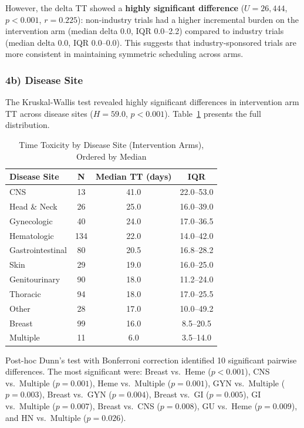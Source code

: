 \documentclass[11pt,a4paper]{article}
\begin{document}
However, the delta TT showed a \textbf{highly significant difference} ($U=26{,}444$, $p<0.001$, $r=0.225$): non-industry trials had a higher incremental burden on the intervention arm (median delta 0.0, IQR 0.0--2.2) compared to industry trials (median delta 0.0, IQR 0.0--0.0). This suggests that industry-sponsored trials are more consistent in maintaining symmetric scheduling across arms.

\subsubsection{4b) Disease Site}

The Kruskal-Wallis test revealed highly significant differences in intervention arm TT across disease sites ($H=59.0$, $p<0.001$). Table~\ref{tab:disease} presents the full distribution.

\begin{table}[H]
\centering
\caption{Time Toxicity by Disease Site (Intervention Arms), Ordered by Median}
\label{tab:disease}
\begin{tabular}{lccc}
\toprule
\textbf{Disease Site} & \textbf{N} & \textbf{Median TT (days)} & \textbf{IQR} \\
\midrule
CNS & 13 & 41.0 & 22.0--53.0 \\
Head \& Neck & 26 & 25.0 & 16.0--39.0 \\
Gynecologic & 40 & 24.0 & 17.0--36.5 \\
Hematologic & 134 & 22.0 & 14.0--42.0 \\
Gastrointestinal & 80 & 20.5 & 16.8--28.2 \\
Skin & 29 & 19.0 & 16.0--25.0 \\
Genitourinary & 90 & 18.0 & 11.2--24.0 \\
Thoracic & 94 & 18.0 & 17.0--25.5 \\
Other & 28 & 17.0 & 10.0--49.2 \\
Breast & 99 & 16.0 & 8.5--20.5 \\
Multiple & 11 & 6.0 & 3.5--14.0 \\
\bottomrule
\end{tabular}
\end{table}

Post-hoc Dunn's test with Bonferroni correction identified 10 significant pairwise differences. The most significant were: Breast vs.\ Heme ($p<0.001$), CNS vs.\ Multiple ($p=0.001$), Heme vs.\ Multiple ($p=0.001$), GYN vs.\ Multiple ($p=0.003$), Breast vs.\ GYN ($p=0.004$), Breast vs.\ GI ($p=0.005$), GI vs.\ Multiple ($p=0.007$), Breast vs.\ CNS ($p=0.008$), GU vs.\ Heme ($p=0.009$), and HN vs.\ Multiple ($p=0.026$).
\end{document}
